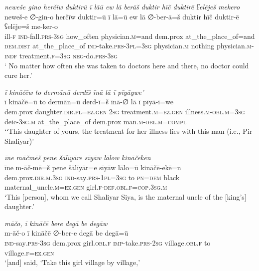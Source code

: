 \ea \label{ZP.26}
\textit{neweše gino herčīw duktirū ī lāū ew lā berāš duktir hīč duktirē ʕelēješ mekero} \\ 
\gll neweš-e ∅-gin-o herčīw duktir=ū ī lā=ū ew lā ∅-ber-ā=š duktir hīč duktir-ē ʕelēje=š me-ker-o \\ 
 ill\textsc{-f} \textsc{ind-}fall\textsc{.prs}\textsc{-3sg} how\_often physician\textsc{.m}=and dem.prox at\_the\_place\_of=and \textsc{dem.dist} at\_the\_place\_of \textsc{ind-}take\textsc{.prs}\textsc{-3pl}\textsc{=3sg} physician\textsc{.m} nothing physician\textsc{.m}\textsc{-indf} treatment\textsc{.f}\textsc{=3sg} \textsc{neg-}do\textsc{.prs}\textsc{-3sg} \\ 
\glt ` No matter how often she was taken to doctors here and there, no doctor could cure her.'
\z 
 
\ea \label{ZP.33}
\textit{ī kināčēw to dermānū derdīš īnā lā ī pīyāywe’} \\ 
\gll ī kināčē=ū to dermān=ū derd-ī=š īnā-∅ lā ī pīyā-ī=we \\ 
 dem.prox daughter\textsc{.dir}\textsc{.pl}\textsc{\textsc{=ez.gen}} \textsc{2sg} treatment\textsc{.m}\textsc{\textsc{=ez.gen}} illness\textsc{.m}\textsc{-obl}\textsc{.m}\textsc{=3sg} deic\textsc{-3sg}\textsc{.m} at\_the\_place\_of dem.prox man\textsc{.m}\textsc{-obl}\textsc{.m}\textsc{=compl} \\ 
\glt `‘This daughter of yours, the treatment for her illness lies with this man (i.e., Pir Shaliyar)'
\z 
 
\ea \label{ZP.36}
\textit{īne māčmēš pene šālīyāre sīyāw lālow kināčekēn} \\ 
\gll īne m-āč-mē=š pene šālīyār=e sīyāw lālo=ū kināčē-ekē=n \\ 
 dem.prox\textsc{.dir}\textsc{.m}\textsc{.3sg} \textsc{ind-}say\textsc{.prs}\textsc{-1pl}\textsc{=3sg} to \textsc{pn}\textsc{=dem} black maternal\_uncle\textsc{.m}\textsc{\textsc{=ez.gen}} girl\textsc{.f}\textsc{-def}\textsc{.obl}\textsc{.f}\textsc{=cop}\textsc{.3sg}\textsc{.m} \\ 
\glt `This [person], whom we call Shaliyar Siya, is the maternal uncle of the [king’s] daughter.'
\z 
 
\ea \label{ZP.39}
\textit{māčo, ī kināčē bere degā be degāw} \\ 
\gll m-āč-o ī kināčē ∅-ber-e degā be degā=ū \\ 
 \textsc{ind-}say\textsc{.prs}\textsc{-3sg} dem.prox girl\textsc{.obl}\textsc{.f} \textsc{imp-}take\textsc{.prs}-\textsc{2sg} village\textsc{.obl}\textsc{.f} to village\textsc{.f}\textsc{\textsc{=ez.gen}} \\ 
\glt `[and] said, ‘Take this girl village by village,'
\z 
 
